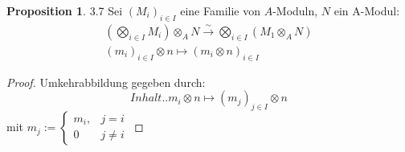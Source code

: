 \documentclass[10pt,a4paper]{article}
\newcounter{thm}[section]
\theoremstyle{definition}
\newtheorem{prop}[thm]{Proposition}
\theoremstyle{plain}
\theoremstyle{remark}
\begin{document}
\begin{prop}3.7
	Sei $(M_i)_{i\in I}$ eine Familie von $A$-Moduln, $N$ ein A-Modul:\begin{align*}
	\left(\bigotimes_{i\in I}M_i\right)\otimes_A N\xrightarrow{\sim} \bigotimes_{i\in I}\left(M_1\otimes_A N\right)\\
	(m_i)_{i\in I}\otimes n\mapsto(m_i\otimes n)_{i\in I}
	\end{align*}
\end{prop}
\begin{proof}
	Umkehrabbildung gegeben durch:\[Inhalt..m_i\otimes n\mapsto (m_j)_{j\in I}\otimes n\]
	mit $m_j:=\begin{cases}
	m_i, &j=i\\
	0 &j\neq i
	\end{cases}$
\end{proof}
\end{document}
